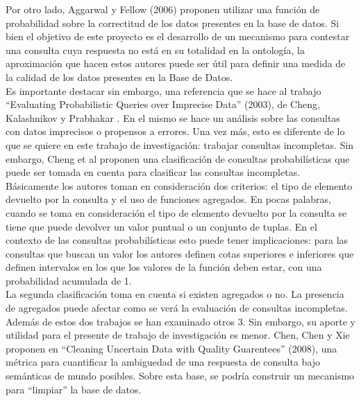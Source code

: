 Por otro lado, Aggarwal y Fellow (2006) \cite{surveyUDAA} proponen  utilizar una función de probabilidad sobre la correctitud de los datos presentes en la base de datos. Si bien el objetivo de este proyecto es el desarrollo de un mecanismo para contestar una consulta cuya respuesta no está en su totalidad en la ontología, la aproximación que hacen estos autores puede ser útil para definir una medida de la calidad de los datos presentes en la Base de Datos. \\

Es importante destacar sin embargo, una referencia que se hace al trabajo “Evaluating Probabilistic Queries over Imprecise Data” (2003), de Cheng, Kalashnikov y Prabhakar \cite{evaluatingProbabilisticQueriesOverImpreciseData}. En el mismo se hace un análisis sobre las consultas con datos imprecisos o propensos a errores. Una vez más, esto es diferente de lo que se quiere en este trabajo de investigación: trabajar consultas incompletas. Sin embargo, Cheng et al proponen una clasificación de consultas probabilísticas que puede ser tomada en cuenta para clasificar las consultas incompletas. \\

Básicamente los autores toman en consideración dos criterios: el tipo de elemento devuelto por la consulta y el uso de funciones agregados. En pocas palabras, cuando se toma en consideración el tipo de elemento devuelto por la consulta se tiene que puede devolver un valor puntual o un conjunto de tuplas. En el contexto de las consultas probabilísticas esto puede tener implicaciones: para las consultas que buscan un valor los autores definen cotas superiores e inferiores que definen intervalos en los que los valores de la función deben estar, con una probabilidad acumulada de 1.  \\

La segunda clasificación toma en cuenta si existen agregados o no. La presencia de agregados puede afectar como se verá la evaluación de consultas incompletas. \\

Además de estos dos trabajos se han examinado otros 3. Sin embargo, su aporte y utilidad  para el presente de trabajo de investigación es menor. Chen, Chen y Xie proponen en “Cleaning Uncertain Data with Quality Guarentees” (2008)\cite{cleaningUncertainDataWithQualityGuarantees}, una métrica para cuantificar la ambiguedad de una respuesta de consulta bajo semánticas de mundo posibles. Sobre esta base, se podría construir un mecanismo para “limpiar” la base de datos. \\

